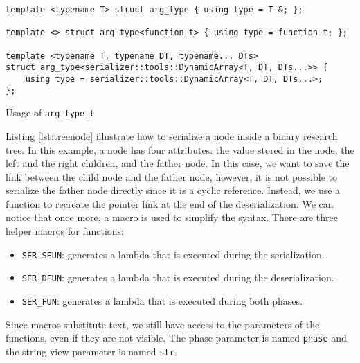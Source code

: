 \begin{listing}[ht!]
\begin{verbatim}
template <typename T> struct arg_type { using type = T &; };

template <> struct arg_type<function_t> { using type = function_t; };

template <typename T, typename DT, typename... DTs>
struct arg_type<serializer::tools::DynamicArray<T, DT, DTs...>> {
    using type = serializer::tools::DynamicArray<T, DT, DTs...>;
};
\end{verbatim}
\caption{Usage of \texttt{arg\_type\_t}}
\label{lst:mlargtype}
\end{listing}

Listing \ref{lst:treenode} illustrate how to serialize a node inside a
binary research tree. In this example, a node has four attributes: the value
stored in the node, the left and the right children, and the father node. In
this case, we want to save the link between the child node and the father node,
however, it is not possible to serialize the father node directly since it is a
cyclic reference. Instead, we use a function to recreate the pointer link at the
end of the deserialization. We can notice that once more, a macro is used to
simplify the syntax. There are three helper macros for functions:

\begin{itemize}
  \item \texttt{SER\_SFUN}: generates a lambda that is executed during the
    serialization.
  \item \texttt{SER\_DFUN}: generates a lambda that is executed during the
    deserialization.
  \item \texttt{SER\_FUN}: generates a lambda that is executed during both
    phases.
\end{itemize}

Since macros substitute text, we still have access to the parameters of the
functions, even if they are not visible. The phase parameter is named
\texttt{phase} and the string view parameter is named \texttt{str}.

